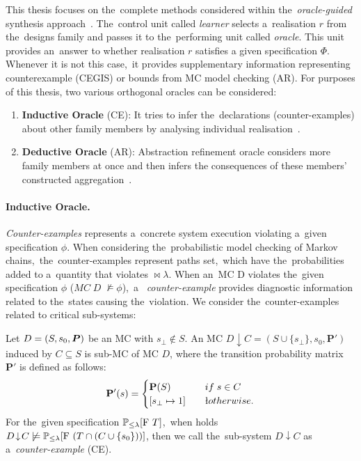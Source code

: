 This thesis focuses on the~complete methods considered within the~\textit{oracle-guided} synthesis approach~\cite{oracle1,oracle2}.
The~control unit called \textit{learner} selects a~realisation $r$ from the~designs family and passes it to the~performing unit called \textit{oracle}.
This unit provides an~answer to whether realisation $r$ satisfies a given specification $\varPhi$.
Whenever it is not this case,~it provides supplementary information representing counterexample (CEGIS) or bounds from MC model checking (AR).
For purposes of this thesis, two various orthogonal oracles can be considered:
\begin{enumerate}[label=(\roman*)]
    \item \textbf{Inductive Oracle} (CE): It tries to infer the~declarations (counter-examples) about other family members by analysing individual realisation~\cite{cegis}.
    \item \textbf{Deductive Oracle} (AR): Abstraction refinement oracle considers more family members at once and then infers the consequences of these members' constructed aggregation~\cite{cegar}.
\end{enumerate}

\paragraph{Inductive Oracle.}
\textit{Counter-examples} represents a~concrete system execution violating a~given specification $\phi$.
When considering the~probabilistic model checking of Markov chains,~the~counter-examples represent paths set,~which have the~probabilities added to a~quantity that violates $\bowtie \lambda$.
When an~MC D violates the~given specification $\phi$ ($MC \; D \; \not\models \phi$),~a~ \textit{counter-example} provides diagnostic information related to the~states causing the~violation.
We consider the~counter-examples related to critical sub-systems:

\begin{definition}
Let $D = (S,s_{0},\boldsymbol{P})$ be an MC with $s_{\bot} \notin S$.
An MC $D \! \downarrow \! C = (S \cup \{ s_{\bot} \}, s_0, \mathbf{P}')$ induced by $C \subseteq S$ is sub-MC of MC $D$, where the transition probability matrix $\mathbf{P}'$ is defined as follows:
\begin{align*}
    \mathbf{P}'(s) = 
    \begin{cases}
        \mathbf{P}(S) \quad & if \; s \in C \\
        [ s_{\bot} \mapsto 1 ] \quad & \l otherwise.  
    \end{cases}
\end{align*}
For the~given specification $\mathbb{P}_{\leq \lambda}[\mathrm{F}\ T]$,~when holds $D \! \downarrow \! C \not \models \mathbb{P}_{\leq \lambda}[\mathrm{F}\ (T \cap (C \cup \{ s_0 \}))]$, then we call the~sub-system $D \! \downarrow \! C$ as a~\textit{counter-example} (CE).
\end{definition}


